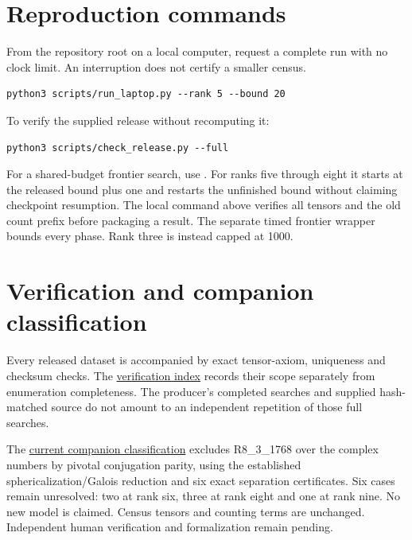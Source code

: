 \documentclass[11pt,a4paper]{article}
\theoremstyle{definition}\newtheorem{definition}[theorem]{Definition}\newtheorem{remark}[theorem]{Remark}
\begin{document}
\par\noindent\begin{minipage}{\linewidth}
\section{Reproduction commands}
From the repository root on a local computer, request a complete run with no clock limit. An interruption does not certify a smaller census.
\par\noindent\begin{minipage}{\linewidth}
\begin{lstlisting}
python3 scripts/run_laptop.py --rank 5 --bound 20
\end{lstlisting}
\end{minipage}\par
To verify the supplied release without recomputing it:
\par\noindent\begin{minipage}{\linewidth}
\begin{lstlisting}
python3 scripts/check_release.py --full
\end{lstlisting}
\end{minipage}\par
For a shared-budget frontier search, use . For ranks five through eight it starts at the released bound plus one and restarts the unfinished bound without claiming checkpoint resumption. The local command above verifies all tensors and the old count prefix before packaging a result. The separate timed frontier wrapper bounds every phase. Rank three is instead capped at 1000.

\end{minipage}\par
\section{Verification and companion classification}

Every released dataset is accompanied by exact tensor-axiom, uniqueness and
checksum checks. The \href{https://github.com/sebastienpalcoux/fusion-ring-census/blob/main/verification/README.md}{verification index}
records their scope separately from enumeration completeness. The producer's
completed searches and supplied hash-matched source do not amount to an
independent repetition of those full searches.

The \href{https://github.com/sebastienpalcoux/grothendieck-ring-classification/blob/main/evidence/frontier/README.md}{current companion classification}
excludes R8\_3\_1768 over the complex numbers by pivotal conjugation parity,
using the established sphericalization/Galois reduction and six exact
separation certificates. Six cases remain unresolved: two at rank six, three at rank eight and one at rank nine. No new model is claimed. Census
tensors and counting terms are unchanged. Independent human verification
and formalization remain pending.
\end{document}
